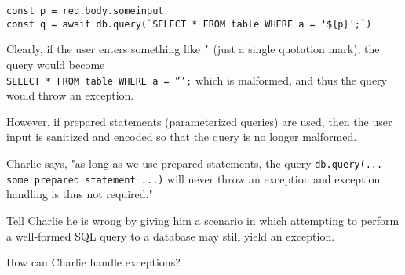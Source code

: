 \documentclass[exam,qn]{yqteach}
\begin{document}
\begin{verbatim}
const p = req.body.someinput
const q = await db.query(`SELECT * FROM table WHERE a = '${p}';`)
\end{verbatim}
Clearly, if the user enters something like \texttt{'} (just a single quotation mark), the query would become\\
\texttt{SELECT * FROM table WHERE a = ''';} which is malformed, and thus the query would throw an exception.

However, if prepared statements (parameterized queries) are used, then the user input is sanitized and encoded so that the query is no longer malformed.

Charlie says, "as long as we use prepared statements, the query \texttt{db.query(... some prepared statement ...)} will never throw an exception and exception handling is thus not required."

 Tell Charlie he is wrong by giving him a scenario in which attempting to perform a well-formed SQL query to a database may still yield an exception.

 How can Charlie handle exceptions?




\endofdocument
\end{document}
